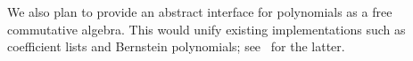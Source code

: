 \documentclass[a4paper,10pt,runningheads]{llncs}
\begin{document}
We also plan to provide an abstract interface for polynomials as a free commutative algebra. This would unify existing implementations such as coefficient lists and Bernstein polynomials; see~\cite{ZumkellerPhD} for the latter.





\end{document}
